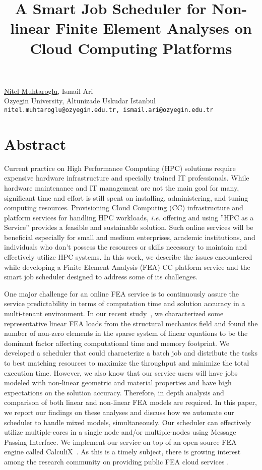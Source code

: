 \title{A Smart Job Scheduler for Non-linear Finite Element Analyses on Cloud Computing Platforms}
\author{} \institute{}
\maketitle

\begin{center}
{\large  \underline{Nitel Muhtaroglu}, Ismail Ari}\\
Ozyegin University, Altunizade Uskudar Istanbul\\
{\tt nitel.muhtaroglu@ozyegin.edu.tr, ismail.ari@ozyegin.edu.tr}
\end{center}

\section*{Abstract}
Current practice on High Performance Computing (HPC) solutions require expensive hardware infrastructure and specially trained IT professionals. While hardware maintenance and IT management are not the main goal for many, significant time and effort is still spent on installing, administering, and tuning computing resources. Provisioning Cloud Computing (CC) infrastructure and platform services for handling HPC workloads, \emph{i.e.} offering and using ''HPC as a Service'' provides a feasible and sustainable solution. Such online services will be beneficial especially for small and medium enterprises, academic institutions, and individuals who don't possess the resources or skills necessary to maintain and effectively utilize HPC systems. In this work, we describe the issues encountered while developing a Finite Element Analysis (FEA) CC platform service and the smart job scheduler designed to address some of its challenges.

One major challenge for an online FEA service is to continuously assure the service predictability in terms of computation time and solution accuracy in a multi-tenant environment. In our recent study~\cite{Muhtaroglu:PARENG11}, we characterized some representative linear FEA loads from the structural mechanics field and found the number of non-zero elements in the sparse system of linear equations to be the dominant factor affecting computational time and memory footprint. We developed a scheduler that could characterize a batch job and distribute the tasks to best matching resources to maximize the throughput and minimize the total execution time. However, we also know that our service users will have jobs modeled with non-linear geometric and material properties and have high expectations on the solution accuracy. Therefore, in depth analysis and comparison of both linear and non-linear FEA models are required. In this paper, we report our findings on these analyses and discuss how we automate our scheduler to handle mixed models, simultaneously. Our scheduler can effectively utilize multiple-cores in a single node and/or multiple-nodes using Message Passing Interface. We implement our service on top of an open-source FEA engine called CalculiX~\cite{Dhondt04}. As this is a timely subject, there is growing interest among the research community on providing public FEA cloud services \cite{SolinFemHub}.


